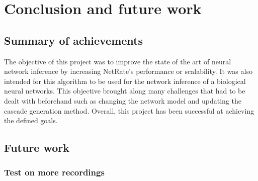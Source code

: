 
\chapter{Conclusion and future work}

\section{Summary of achievements}

The objective of this project was to improve the state of the art of neural network inference by increasing NetRate's performance or scalability. It was also intended for this algorithm to be used for the network inference of a biological neural networks. This objective brought along many challenges that had to be dealt with beforehand such as changing the network model and updating the cascade generation method. Overall, this project has been successful at achieving the defined goals. \\



\section{Future work}

\subsection{Test on more recordings}

